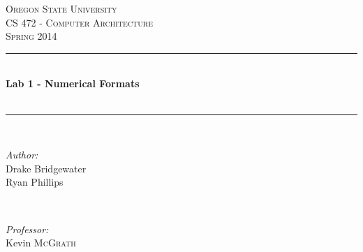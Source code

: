 \documentclass[letterpaper,12pt,titlepage]{article}
\def\name{Drake Bridgewater \\  Ryan Phillips}
\def\title{Lab 1 - Numerical Formats}
\def\subtitle{}
\def\subject{CS }
\def\courseNumber{ 472 }
\def\courseName{Computer Architecture }
\def\courseInfo{Spring 2014 }%
\def\supervisor{Kevin \textsc{McGrath}} %
\begin{document}
\begin{titlepage}

\newcommand{\HRule}{\rule{\linewidth}{0.5mm}} %

\center %
 

\textsc{\LARGE Oregon State University}\\[1.5cm] %
\textsc{\Large \subject \courseNumber - \courseName}\\[0.5cm] %
\textsc{\large \courseInfo}\\[0.5cm] %


\HRule \\[0.4cm]
{ \huge \bfseries \title }\\[0.4cm] %
{\small \textit{\subtitle}}\\[0.4cm]
\HRule \\[1.5cm]
 

\begin{minipage}{0.4\textwidth}
\begin{flushleft} \large
\emph{Author:}\\
\name
\end{flushleft}
\end{minipage}
~
\begin{minipage}{0.4\textwidth}
\begin{flushright} \large
\emph{Professor:} \\
\supervisor
\end{flushright}
\end{minipage}\\[4cm]



\end{titlepage}
\end{document}
